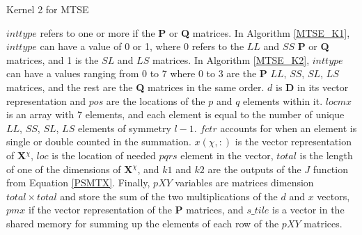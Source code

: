 \begin{algorithm}
\caption{Kernel 2 for MTSE}
\label{MTSE_K2}
\begin{algorithmic}


	\ELSE
	\ENDIF
	\ELSE
	\ENDIF
\ELSE
{}
\ENDIF
{}
	\ENDIF
\ENDFOR	 
{}
	
	\ELSE
	\ENDIF	
\ENDIF

\end{algorithmic}
\end{algorithm}

$inttype$ refers to one or more if the \textbf{P} or \textbf{Q} matrices. In Algorithm \ref{MTSE_K1}, $inttype$ can have a value of 0 or 1, where 0 refers to the $LL$ and $SS$ \textbf{P} or \textbf{Q} matrices, and 1 is the $SL$ and $LS$ matrices.  In Algorithm \ref{MTSE_K2}, $inttype$ can have a values ranging from 0 to 7 where 0 to 3 are the \textbf{P} $LL$, $SS$, $SL$, $LS$ matrices, and the rest are the \textbf{Q} matrices in the same order. $d$ is \textbf{D} in its vector representation and $pos$ are the locations of the $p$ and $q$ elements within it. $locmx$ is an array with 7 elements, and each element is equal to the number of unique $LL$, $SS$, $SL$, $LS$ elements of symmetry $l-1$. $fctr$ accounts for when an element is single or double counted in the summation. $x(\chi, :)$ is the vector representation of \textbf{X$^{\chi}$}, $loc$ is the location of needed $pqrs$ element in the vector, $total$ is the length of one of the dimensions of \textbf{X$^{\chi}$}, and $k1$ and $k2$ are the outputs of the $J$ function from Equation \ref{PSMTX}. Finally, $pXY$ variables are matrices dimension $total \times total$ and store the sum of the two multiplications of the $d$ and $x$ vectors, $pmx$ if the vector representation of the \textbf{P} matrices, and $s\_tile$ is a vector in the shared memory for summing up the elements of each row of the $pXY$ matrices. 

